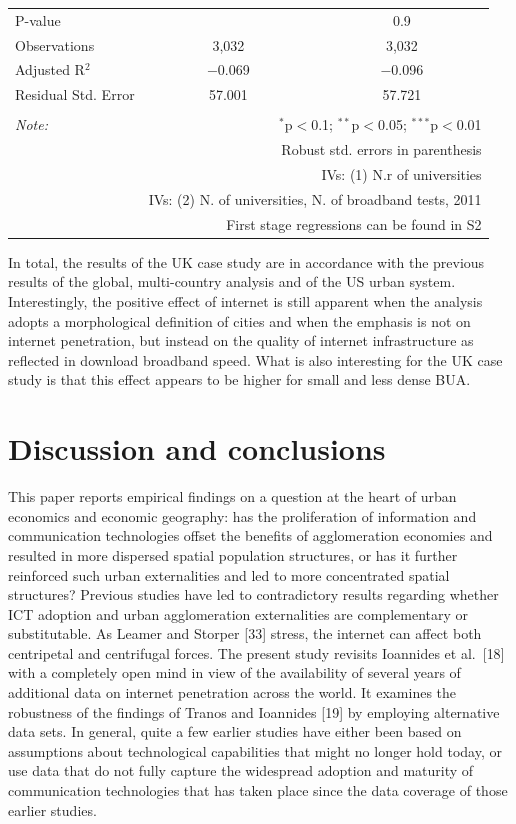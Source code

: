 \documentclass[10pt,letterpaper]{article}
\begin{document}
\begin{table}[!htbp]
\begin{tabular}{@{\extracolsep{5pt}}lcc}
P-value &  & 0.9 \\ 
Observations & 3,032 & 3,032 \\ 
Adjusted R$^{2}$ & $-$0.069 & $-$0.096 \\ 
Residual Std. Error & 57.001 & 57.721 \\ 
\hline 
\hline \\[-1.8ex] 
\textit{Note:}  & \multicolumn{2}{r}{$^{*}$p$<$0.1; $^{**}$p$<$0.05; $^{***}$p$<$0.01} \\ 
 & \multicolumn{2}{r}{Robust std. errors in parenthesis} \\ 
 & \multicolumn{2}{r}{IVs: (1) N.r of universities} \\ 
 & \multicolumn{2}{r}{IVs: (2) N. of universities, N. of broadband tests, 2011} \\ 
 & \multicolumn{2}{r}{First stage regressions can be found in S2} \\ 
\end{tabular} 
\end{table}

In total, the results of the UK case study are in accordance with the
previous results of the global, multi-country analysis and of the US
urban system. Interestingly, the positive effect of internet is still
apparent when the analysis adopts a morphological definition of cities
and when the emphasis is not on internet penetration, but instead on the
quality of internet infrastructure as reflected in download broadband
speed. What is also interesting for the UK case study is that this
effect appears to be higher for small and less dense BUA.

\hypertarget{sec6}{%
\section{Discussion and conclusions}\label{sec6}}

This paper reports empirical findings on a question at the heart of
urban economics and economic geography: has the proliferation of
information and communication technologies offset the benefits of
agglomeration economies and resulted in more dispersed spatial
population structures, or has it further reinforced such urban
externalities and led to more concentrated spatial structures? Previous
studies have led to contradictory results regarding whether ICT adoption
and urban agglomeration externalities are complementary or
substitutable. As Leamer and Storper {[}33{]} stress, the internet can
affect both centripetal and centrifugal forces. The present study
revisits Ioannides et al.~{[}18{]} with a completely open mind in view
of the availability of several years of additional data on internet
penetration across the world. It examines the robustness of the findings
of Tranos and Ioannides {[}19{]} by employing alternative data sets. In
general, quite a few earlier studies have either been based on
assumptions about technological capabilities that might no longer hold
today, or use data that do not fully capture the widespread adoption and
maturity of communication technologies that has taken place since the
data coverage of those earlier studies.
\end{document}
